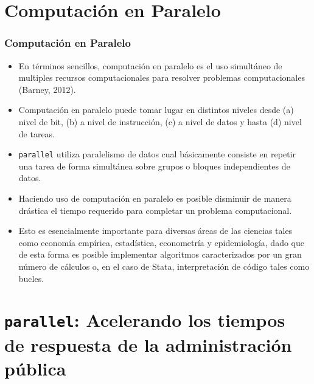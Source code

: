 \documentclass{beamer}
\begin{document}
\section{Computaci\'on en Paralelo}
\begin{frame}[allowframebreaks=.8]
\frametitle{Computaci\'on en Paralelo}

\begin{itemize}
\item En t\'erminos sencillos, computaci\'on en paralelo es el uso simult\'aneo de multiples recursos computacionales para resolver problemas computacionales (Barney, 2012).
\item Computaci\'on en paralelo puede tomar lugar en distintos niveles desde (a) nivel de bit, (b) a nivel de instrucci\'on, (c) a nivel de datos y hasta (d) nivel de tareas.
\item {\tt parallel} utiliza paralelismo de datos cual b\'asicamente consiste en repetir una tarea de forma simult\'anea sobre grupos o bloques independientes de datos.
\item Haciendo uso de computaci\'on en paralelo es posible disminuir de manera dr\'astica el tiempo requerido para completar un problema computacional.
\item Esto es esencialmente importante para diversas \'areas de las ciencias tales como econom\'ia emp\'irica, estad\'istica, econometr\'ia y epidemiolog\'ia, dado que de esta forma es posible implementar algoritmos caracterizados por un gran n\'umero de c\'alculos o, en el caso de Stata, interpretaci\'on de c\'odigo tales como bucles.
\end{itemize}

\end{frame}

\section{{\tt parallel}: Acelerando los tiempos de respuesta de la administraci\'on p\'ublica}
\end{document}
